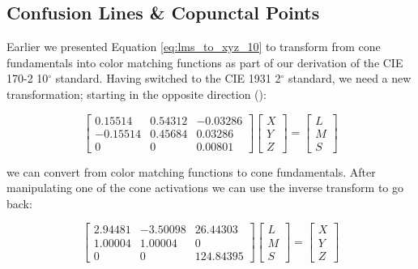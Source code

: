 \documentclass{article}
\begin{document}
\subsection{Confusion Lines \& Copunctal Points} %

Earlier we presented Equation \ref{eq:lms_to_xyz_10} to transform from cone fundamentals into color matching functions as part of our derivation of the CIE 170-2 10$^\circ$ standard.  Having switched to the CIE 1931 2$^\circ$ standard, we need a new transformation; starting in the opposite direction (\cite{smith1975spectral}):

\begin{equation} %
    \begin{bmatrix}
        0.15514&0.54312&-0.03286\\
        -0.15514&0.45684&0.03286\\
        0&0&0.00801
    \end{bmatrix}\begin{bmatrix}
        X\\
        Y\\
        Z
    \end{bmatrix}=\begin{bmatrix}
        L\\
        M\\
        S
    \end{bmatrix}
\end{equation}

we can convert from color matching functions to cone fundamentals.  After manipulating one of the cone activations we can use the inverse transform to go back:

\begin{equation} %
    \begin{bmatrix}
        2.94481&-3.50098&26.44303\\
        1.00004&1.00004&0\\
        0&0&124.84395
    \end{bmatrix}\begin{bmatrix}
        L\\
        M\\
        S
    \end{bmatrix}=\begin{bmatrix}
        X\\
        Y\\
        Z
    \end{bmatrix}
\end{equation}
\end{document}
